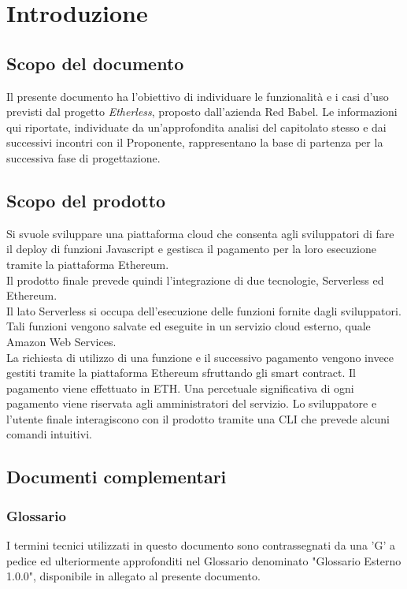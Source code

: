 \section{Introduzione}
\subsection{Scopo del documento}
	Il presente documento ha l'obiettivo di individuare le funzionalità e i casi d'uso previsti dal progetto \textit{Etherless}, proposto dall'azienda Red Babel. Le informazioni qui riportate, individuate da un'approfondita analisi del capitolato stesso e dai successivi incontri con il Proponente, rappresentano la base di partenza per la successiva fase di progettazione.

\subsection{Scopo del prodotto}
	Si svuole sviluppare una piattaforma cloud che consenta agli sviluppatori di fare il deploy di funzioni Javascript e gestisca il pagamento per la loro esecuzione tramite la piattaforma Ethereum.\\
	Il prodotto finale prevede quindi l'integrazione di due tecnologie, Serverless ed Ethereum.\\
	Il lato Serverless si occupa dell'esecuzione delle funzioni fornite dagli sviluppatori. Tali funzioni vengono salvate ed eseguite in un servizio cloud esterno, quale Amazon Web Services.  \\La richiesta di utilizzo di una funzione e il successivo pagamento vengono invece gestiti tramite la piattaforma Ethereum sfruttando gli smart contract. Il pagamento viene effettuato in ETH. Una percetuale significativa di ogni pagamento viene riservata agli amministratori del servizio. 
	Lo sviluppatore e l'utente finale interagiscono con il prodotto tramite una CLI che prevede alcuni comandi intuitivi.

\subsection{Documenti complementari}
\subsubsection{Glossario}
	I termini tecnici utilizzati in questo documento sono contrassegnati da una ’G’ a pedice ed ulteriormente approfonditi nel Glossario denominato "Glossario Esterno 1.0.0", disponibile in allegato al presente documento.

